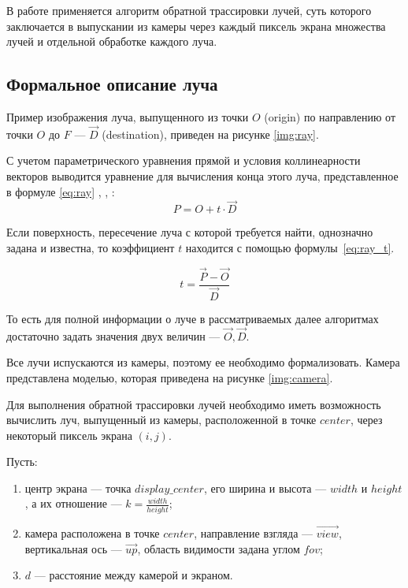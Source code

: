 В работе применяется алгоритм обратной трассировки лучей, суть которого заключается в выпускании из камеры через каждый пиксель экрана множества лучей и отдельной обработке каждого луча.

\subsection{Формальное описание луча}

Пример изображения луча, выпущенного из точки $O$ (origin) по направлению от точки $O$ до $F$ --- $\overrightarrow{D}$ (destination), приведен на рисунке \ref{img:ray}.

С учетом параметрического уравнения прямой и условия коллинеарности векторов выводится уравнение для вычисления конца этого луча, представленное в формуле \ref{eq:ray} \cite{божко2007компьютерная}, \cite{роджерс}, \cite{боресков}:
\begin{equation}\label{eq:ray}
	P = O + t \cdot \overrightarrow{D}
\end{equation}


Если поверхность, пересечение луча с которой требуется найти, однозначно задана и известна, то коэффициент $t$ находится с помощью формулы~\ref{eq:ray_t}.

\begin{equation}\label{eq:ray_t}
	t = \frac{\overrightarrow{P} - \overrightarrow{O}}{\overrightarrow{D}}
\end{equation}

То есть для полной информации о луче в рассматриваемых далее алгоритмах достаточно задать значения двух величин --- $\overrightarrow{O}, \overrightarrow{D}$.

Все лучи испускаются из камеры, поэтому ее необходимо формализовать.
Камера представлена моделью, которая приведена на рисунке \ref{img:camera}.


Для выполнения обратной трассировки лучей необходимо иметь возможность вычислить луч, выпущенный из камеры, расположенной в точке $center$, через некоторый пиксель экрана $(i, j)$.

Пусть:
\begin{enumerate}
	\item центр экрана --- точка $display\_center$, его ширина и высота --- $width$ и $height$, а их отношение --- $k = \frac{width}{height}$;
	\item камера расположена в точке $center$, направление взгляда --- $\overrightarrow{view}$, вертикальная ось --- $\overrightarrow{up}$, область видимости задана углом $fov$;
	\item $d$ --- расстояние между камерой и экраном.
\end{enumerate}


